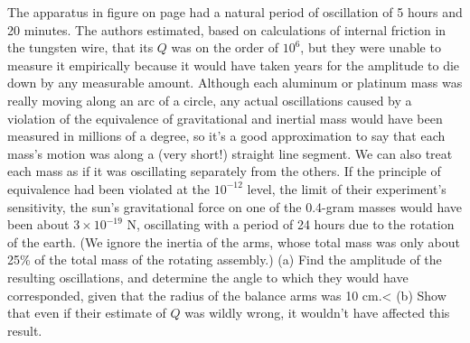         The apparatus in figure  on page \pageref{fig:braginskii}
        had a natural period of oscillation of 5 hours and 20 minutes.
        The authors estimated, based on calculations of internal friction in the tungsten
        wire, that its $Q$ was on the order of $10^6$, but they were unable
        to measure it empirically because it would have taken years for the amplitude
        to die down by any measurable amount. Although each aluminum or platinum
        mass was really moving along an arc of a circle, any actual oscillations caused
        by a violation of the equivalence of gravitational and inertial mass
         would have been measured in millions
        of a degree, so it's a good approximation to say that each mass's motion was
        along a (very short!) straight line segment. We can also treat each mass as if it
        was oscillating separately from the others. If the principle of equivalence
        had been violated at the $10^{-12}$ level, the limit of their experiment's
        sensitivity, the sun's gravitational force on one of the 0.4-gram masses
        would have been about $3\times10^{-19}$ N, oscillating with a period of
        24 hours due to the rotation of the earth. (We ignore the inertia of the arms,
        whose total mass was only about 25\% of the total mass of the rotating assembly.)\hwendpart
        (a) Find the amplitude of the resulting
        oscillations, and determine the angle to which they would have corresponded,
        given that the radius of the balance arms was 10 cm.<%
        (b) Show that even if their estimate of $Q$ was wildly wrong, it wouldn't have affected this
        result.
